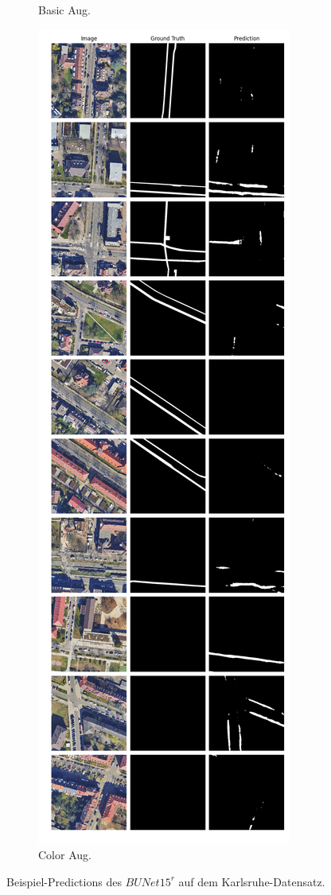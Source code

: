 \begin{figure}
\begin{subfigure}{.4\textwidth}
		\caption{Basic Aug.}
	\end{subfigure}
	\begin{subfigure}{.4\textwidth}
		\centering
		\includegraphics[width=1.\textwidth]{Bilder/karlsruhe-color-samples/bunet15-r.png}
		\caption{Color Aug.}
	\end{subfigure}
	\caption{Beispiel-Predictions des $BUNet15^r$ auf dem Karlsruhe-Datensatz.}
	\label{fig:ka-samples-bunet15-r}
	\end{figure}
	
